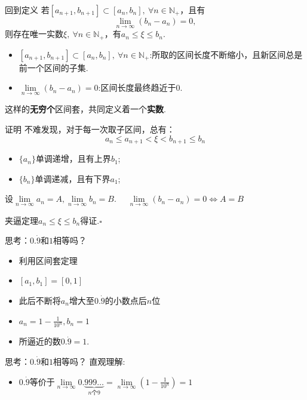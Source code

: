 \documentclass[]{beamer}
\begin{document}
\begin{frame}{回到定义}
    若$[a_{n+1},b_{n+1}]\subset[a_n,b_n],\ \forall n\in\mathbb{N}_+$，且有
    \[
    \lim_{n\rightarrow\infty}(b_n-a_n)=0,
    \]
    则存在唯一实数$\xi,\ \forall n\in\mathbb{N}_+$，有$a_n\le\xi\le b_n.$
    \begin{itemize}
        \item $[a_{n+1},b_{n+1}]\subset[a_n,b_n],\ \forall n\in\mathbb{N}_+$:所取的区间长度不断缩小，且新区间总是前一个区间的子集.
        \item $\lim\limits_{n\rightarrow\infty}(b_n-a_n)=0$:区间长度最终趋近于$0$.
    \end{itemize}
    这样的\textbf{无穷个}区间套，共同定义着一个\textbf{实数}.
\end{frame}

\begin{frame}{证明}
    不难发现，对于每一次取子区间，总有：
    \[a_n\le a_{n+1} <\xi < b_{n+1} \le b_n\]
    \begin{itemize}
        \item $\{a_n\}$单调递增，且有上界$b_1$;
        \item $\{b_n\}$单调递减，且有下界$a_1$;
    \end{itemize}

    设$\lim\limits_{n\rightarrow\infty}a_n = A,\lim\limits_{n\rightarrow\infty}b_n = B$.
    $\quad\lim\limits_{n\rightarrow\infty}(b_n-a_n)=0 \Leftrightarrow A=B$
    
    夹逼定理$a_n\le\xi\le b_n$得证.$\square$
\end{frame}



\begin{frame}{思考：$0.\dot{9}$和$1$相等吗？}
    \begin{itemize}
        \item 利用区间套定理
        \item $[a_1,b_1]=[0,1]$
        \item 此后不断将$a_n$增大至$0.\dot{9}$的小数点后$n$位
        \item $a_n=1-\frac{1}{10^n},b_n=1$
        \item 所逼近的数$0.\dot{9}=1$.
    \end{itemize}
\end{frame}

\begin{frame}{思考：$0.\dot{9}$和$1$相等吗？}
    直观理解:
    \begin{itemize}
        \item $0.\dot{9}$等价于$\lim\limits_{n\rightarrow\infty}0.\underbrace{999\ldots}_{n\text{个}9}=\lim\limits_{n\rightarrow\infty}(1-{\displaystyle\frac{1}{{10}^n}})=1$
    \end{itemize}
\end{frame}
\end{document}
